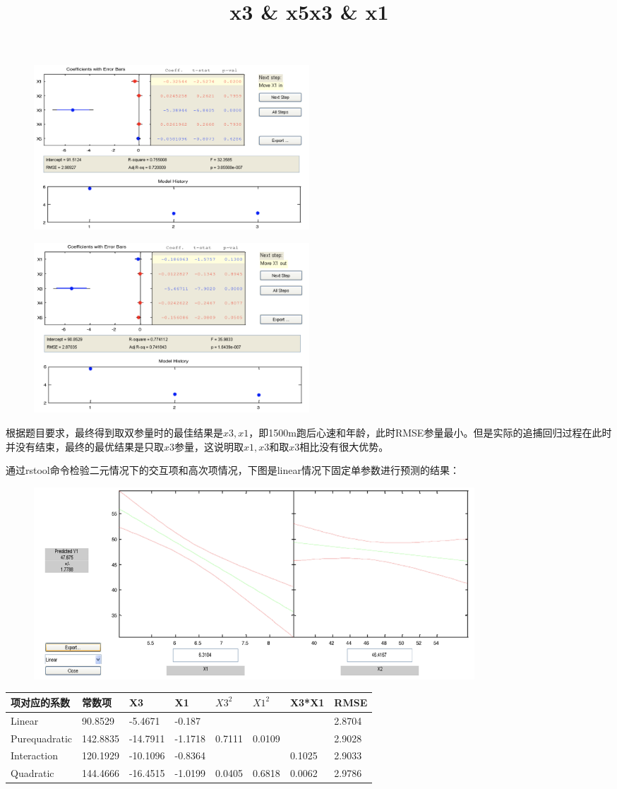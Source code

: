 \documentclass{article}
\begin{document}
\begin{figure}[H]
    \centering
    \includegraphics[width=0.5\textwidth]{pic4.png}
    \title{x3 \& x5}
\end{figure}

\begin{figure}[H]
    \centering
    \includegraphics[width=0.5\textwidth]{pic5.png}
    \title{x3 \& x1}
\end{figure}

根据题目要求，最终得到取双参量时的最佳结果是$x3,x1$，即1500m跑后心速和年龄，此时RMSE参量最小。但是实际的追捕回归过程在此时并没有结束，最终的最优结果是只取$x3$参量，这说明取$x1,x3$和取$x3$相比没有很大优势。

通过rstool命令检验二元情况下的交互项和高次项情况，下图是linear情况下固定单参数进行预测的结果：

\begin{figure}[H]
    \centering
    \includegraphics[width=0.8\textwidth]{pic6.png}
\end{figure}

\begin{table}[H]
\centering
\begin{tabular}{|l|l|l|l|l|l|l|l|}
\hline
项对应的系数 &常数项&X3&X1&$X3^2$&$X1^2$&X3*X1&RMSE\\ \hline
Linear & 90.8529& -5.4671 & -0.187  & &  &  & 2.8704 \\ \hline
Purequadratic & 142.8835 & -14.7911 & -1.1718  & 0.7111 & 0.0109  & & 2.9028 \\ \hline
Interaction & 120.1929 & -10.1096 & -0.8364 &   &  & 0.1025 & 2.9033  \\ \hline
Quadratic & 144.4666 & -16.4515 & -1.0199 & 0.0405 & 0.6818  & 0.0062 & 2.9786 \\ \hline
\end{tabular}
\end{table}
\end{document}
